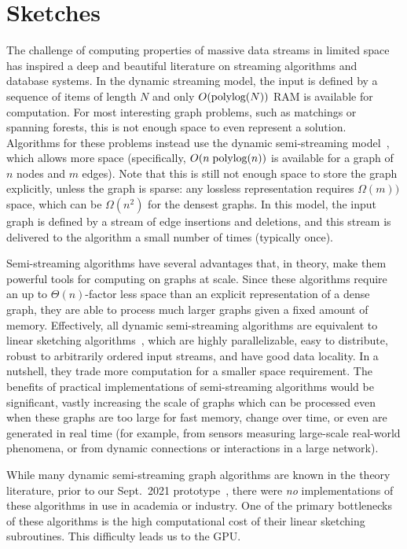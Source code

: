 \section{Sketches}



The challenge of computing properties of massive data streams in limited space has inspired a deep and beautiful literature on streaming algorithms and database systems. In the dynamic streaming model, the input is defined by a sequence of items of length $N$ and only $O(\textrm{polylog}{(N)})$ {RAM} is available for computation. For most interesting graph problems, such as matchings or spanning forests, this is not enough space to even represent a solution. Algorithms for these problems instead use the dynamic semi-streaming model~\cite{insertonlysemistreaming}, which allows more space (specifically, $O(n \; \textrm{polylog}{(n)})$  is available for a graph of $n$ nodes and $m$ edges). Note that this is still not enough space to store the graph explicitly, unless the graph is sparse: any lossless representation requires $\Omega(m))$ space, which can be $\Omega(n^2)$ for the densest graphs. In this model, the input graph is defined by a stream of edge insertions and deletions, and this stream is delivered to the algorithm a small number of times (typically once).

Semi-streaming algorithms have several advantages that, in theory, make them powerful tools for computing on graphs at scale.  Since these algorithms require an up to $\Theta(n)$-factor less space than an explicit representation of a dense graph, they are able to process much larger graphs given a fixed amount of memory. Effectively, all dynamic semi-streaming algorithms are equivalent to linear sketching algorithms~\cite{li2014sketchuniversal}, which are highly parallelizable, easy to distribute, robust to arbitrarily ordered input streams, and have good data locality. In a nutshell, they trade more computation for a smaller space requirement. %
The benefits of practical implementations of semi-streaming algorithms would be significant, vastly increasing the scale of graphs which can be processed even when these graphs are too large for fast memory, change over time, or even are generated in real time (for example, from sensors measuring large-scale real-world phenomena, or from dynamic connections or interactions in a large network).

While many dynamic semi-streaming graph algorithms\cite{Ahn2012, AhnGM12b, AhnGM13, GuhaMT15, KapralovLMMS13, ChitnisCEHMMV16, AssadiKL16, McGregorVV16, pagh2012colorful, 10.1007/978-3-662-48054-0_39, clustering, 10.1007/978-3-319-21398-9_57, streamsetbounds, Chakrabarti2015IncidenceGA, kveton2016graphical, CrouchMS13} are known in the theory literature, prior to our Sept.\ 2021 prototype~\cite{graphzeppelin}, there were \emph{no} implementations of these algorithms in use in academia or industry.  One of the primary bottlenecks of these algorithms is the high computational cost of their linear sketching subroutines. This difficulty leads us to the GPU.

